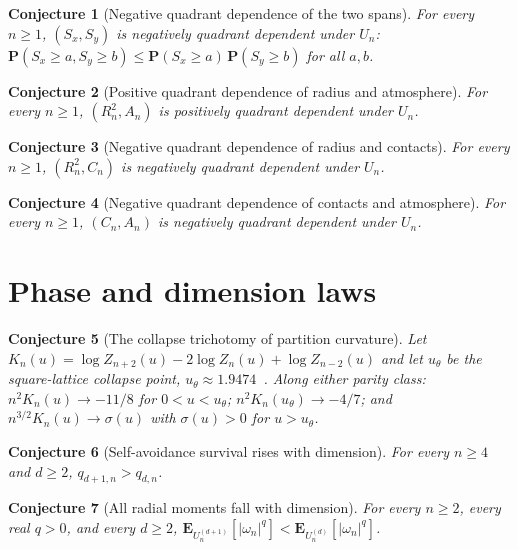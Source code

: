 \documentclass[11pt]{article}
\newtheorem{conjecture}{Conjecture}
\theoremstyle{definition}
\begin{document}
\begin{conjecture}[Negative quadrant dependence of the two spans]\label{af9}
For every $n\ge1$, $(S_x,S_y)$ is negatively quadrant dependent under $U_n$: $\mathbf P(S_x\ge a,S_y\ge b)\le\mathbf P(S_x\ge a)\,\mathbf P(S_y\ge b)$ for all $a,b$.
\end{conjecture}

\begin{conjecture}[Positive quadrant dependence of radius and atmosphere]\label{af10}
For every $n\ge1$, $(R_n^2,A_n)$ is positively quadrant dependent under $U_n$.
\end{conjecture}

\begin{conjecture}[Negative quadrant dependence of radius and contacts]\label{af11}
For every $n\ge1$, $(R_n^2,C_n)$ is negatively quadrant dependent under $U_n$.
\end{conjecture}

\begin{conjecture}[Negative quadrant dependence of contacts and atmosphere]\label{af12}
For every $n\ge1$, $(C_n,A_n)$ is negatively quadrant dependent under $U_n$.
\end{conjecture}

\section{Phase and dimension laws}

\begin{conjecture}[The collapse trichotomy of partition curvature]\label{af13}
Let $K_n(u)=\log Z_{n+2}(u)-2\log Z_n(u)+\log Z_{n-2}(u)$ and let $u_\theta$ be the square-lattice collapse point, $u_\theta\approx1.9474$~\cite{BGJ20}.  Along either parity class: $n^2K_n(u)\to-11/8$ for $0<u<u_\theta$; $n^2K_n(u_\theta)\to-4/7$; and $n^{3/2}K_n(u)\to\sigma(u)$ with $\sigma(u)>0$ for $u>u_\theta$.
\end{conjecture}

\begin{conjecture}[Self-avoidance survival rises with dimension]\label{af14}
For every $n\ge4$ and $d\ge2$, $q_{d+1,n}>q_{d,n}$.
\end{conjecture}

\begin{conjecture}[All radial moments fall with dimension]\label{af15}
For every $n\ge2$, every real $q>0$, and every $d\ge2$, $\mathbf E_{U_n^{(d+1)}}[|\omega_n|^q]<\mathbf E_{U_n^{(d)}}[|\omega_n|^q]$.
\end{conjecture}
\end{document}
